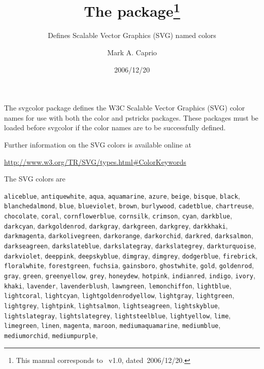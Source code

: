 \documentclass[pagesize=auto, fontsize=12pt, DIV=9, parskip=half]{scrartcl}
\title{The \pkg{svgcolor} package\thanks{This manual corresponds to \pkg{svgcolor.sty}~v1.0, dated~2006/12/20.}}
\subtitle{Defines Scalable Vector Graphics (SVG) named colors}
\author{Mark A. Caprio}
\date{2006/12/20}
\newcommand*{\pkg}[1]{\textsf{#1}}
\begin{document}
\maketitle

The \pkg{svgcolor} package defines the W3C Scalable Vector Graphics (SVG)
color names for use with both the \pkg{color} and \pkg{pstricks} packages.  These
packages must be loaded before \pkg{svgcolor} if the color names are to be
successfully defined.

Further information on the SVG colors is available online at

   \url{http://www.w3.org/TR/SVG/types.html#ColorKeywords}

The SVG colors are

\raggedright
\texttt{aliceblue},
\texttt{antiquewhite},
\texttt{aqua},
\texttt{aquamarine},
\texttt{azure},
\texttt{beige},
\texttt{bisque},
\texttt{black},
\texttt{blanchedalmond},
\texttt{blue},
\texttt{blueviolet},
\texttt{brown},
\texttt{burlywood},
\texttt{cadetblue},
\texttt{chartreuse},
\texttt{chocolate},
\texttt{coral},
\texttt{cornflowerblue},
\texttt{cornsilk},
\texttt{crimson},
\texttt{cyan},
\texttt{darkblue},
\texttt{darkcyan},
\texttt{darkgoldenrod},
\texttt{darkgray},
\texttt{darkgreen},
\texttt{darkgrey},
\texttt{darkkhaki},
\texttt{darkmagenta},
\texttt{darkolivegreen},
\texttt{darkorange},
\texttt{darkorchid},
\texttt{darkred},
\texttt{darksalmon},
\texttt{darkseagreen},
\texttt{darkslateblue},
\texttt{darkslategray},
\texttt{darkslategrey},
\texttt{darkturquoise},
\texttt{darkviolet},
\texttt{deeppink},
\texttt{deepskyblue},
\texttt{dimgray},
\texttt{dimgrey},
\texttt{dodgerblue},
\texttt{firebrick},
\texttt{floralwhite},
\texttt{forestgreen},
\texttt{fuchsia},
\texttt{gainsboro},
\texttt{ghostwhite},
\texttt{gold},
\texttt{goldenrod},
\texttt{gray},
\texttt{green},
\texttt{greenyellow},
\texttt{grey},
\texttt{honeydew},
\texttt{hotpink},
\texttt{indianred},
\texttt{indigo},
\texttt{ivory},
\texttt{khaki},
\texttt{lavender},
\texttt{lavenderblush},
\texttt{lawngreen},
\texttt{lemonchiffon},
\texttt{lightblue},
\texttt{lightcoral},
\texttt{lightcyan},
\texttt{lightgoldenrodyellow},
\texttt{lightgray},
\texttt{lightgreen},
\texttt{lightgrey},
\texttt{lightpink},
\texttt{lightsalmon},
\texttt{lightseagreen},
\texttt{lightskyblue},
\texttt{lightslategray},
\texttt{lightslategrey},
\texttt{lightsteelblue},
\texttt{lightyellow},
\texttt{lime},
\texttt{limegreen},
\texttt{linen},
\texttt{magenta},
\texttt{maroon},
\texttt{mediumaquamarine},
\texttt{mediumblue},
\texttt{mediumorchid},
\texttt{mediumpurple},
\end{document}
